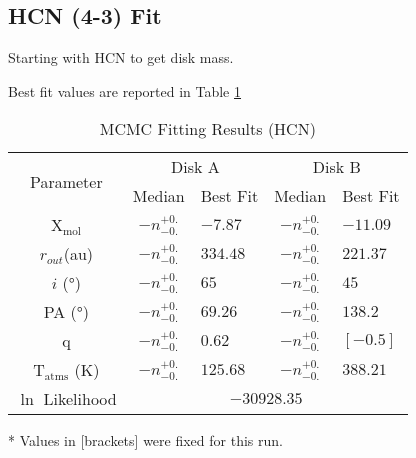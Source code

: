 \subsection{HCN (4-3) Fit}
Starting with HCN to get disk mass.

Best fit values are reported in Table \ref{table:fit_hcn}


\begin{table}
  \begin{threeparttable}
    \centering
    \caption{MCMC Fitting Results (HCN)}
    \label{table:fit_hcn}
    \renewcommand{\arraystretch}{1.2}
    \begin{tabular}{c c l c l }
      \toprule \toprule
      \multirow{2}{*}{Parameter} & \multicolumn{2}{c}{Disk A} & \multicolumn{2}{c}{Disk B} \\
                                 & Median & Best Fit          & Median & Best Fit \\
      \midrule %
      X$_\text{mol}$             & $ -n _{-0.} ^{+0.}$ & $-7.87$    & $ -n _{-0.} ^{+0.}$ & $-11.09$ \\
      $r_{out}$(\si{au})        & $ -n _{-0.} ^{+0.}$ & $334.48$    & $ -n _{-0.} ^{+0.}$  & $221.37$    \\
      $i$ (\si{\degree})        & $ -n _{-0.} ^{+0.}$ & $65$    & $ -n _{-0.} ^{+0.}$ & $45$    \\
      PA  (\si{\degree})        & $ -n _{-0.} ^{+0.}$ & $69.26$  & $ -n _{-0.} ^{+0.}$  & $138.2$  \\
      q                         & $ -n _{-0.} ^{+0.}$ & $0.62$  & $ -n _{-0.} ^{+0.}$  & $[-0.5]$  \\
      T$_\text{atms}$ (\si{\K}) & $ -n _{-0.} ^{+0.}$ & $125.68 $  & $ -n _{-0.} ^{+0.}$  & $388.21$  \\
      $\ln$ Likelihood          & \multicolumn{4}{c}{$-30928.35$} \\
      \bottomrule
    \end{tabular}
    \begin{tablenotes}\footnotesize
      \item[*] Values in [brackets] were fixed for this run.
    \end{tablenotes}
  \end{threeparttable}
\end{table}












